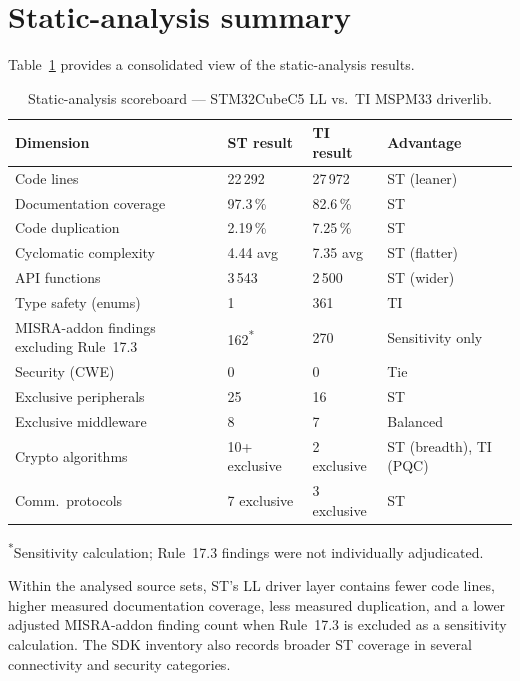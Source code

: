 \section{Static-analysis summary}
\label{sec:ti-static-summary}

Table~\ref{tab:ti-summary-scoreboard} provides a consolidated view of the static-analysis
results.

\begin{table}[H]
\centering
\caption{Static-analysis scoreboard --- STM32CubeC5 LL vs.\ TI MSPM33 driverlib.}
\label{tab:ti-summary-scoreboard}
\begin{tabular}{l l l l}
\toprule
\textbf{Dimension} & \textbf{ST result} & \textbf{TI result} & \textbf{Advantage} \\
\midrule
Code lines            & 22\,292          & 27\,972          & ST (leaner) \\
Documentation coverage & 97.3\,\%        & 82.6\,\%         & ST \\
Code duplication       & 2.19\,\%        & 7.25\,\%         & ST \\
Cyclomatic complexity  & 4.44 avg        & 7.35 avg         & ST (flatter) \\
API functions          & 3\,543          & 2\,500           & ST (wider) \\
Type safety (enums)    & 1               & 361              & TI \\
MISRA-addon findings excluding Rule~17.3 & 162\textsuperscript{*} & 270 & Sensitivity only \\
Security (CWE)         & 0               & 0                & Tie \\
Exclusive peripherals  & 25              & 16               & ST \\
Exclusive middleware   & 8               & 7                & Balanced \\
Crypto algorithms      & 10+ exclusive   & 2 exclusive      & ST (breadth), TI (PQC) \\
Comm.\ protocols       & 7 exclusive     & 3 exclusive      & ST \\
\bottomrule
\end{tabular}
\par\smallskip
{\footnotesize \textsuperscript{*}Sensitivity calculation; Rule~17.3 findings were not individually adjudicated.}
\end{table}

Within the analysed source sets, ST's LL driver layer contains fewer code lines, higher
measured documentation coverage, less measured duplication, and a lower adjusted
MISRA-addon finding count when Rule~17.3 is excluded as a sensitivity calculation. The SDK
inventory also records broader ST coverage in several connectivity and security categories.

